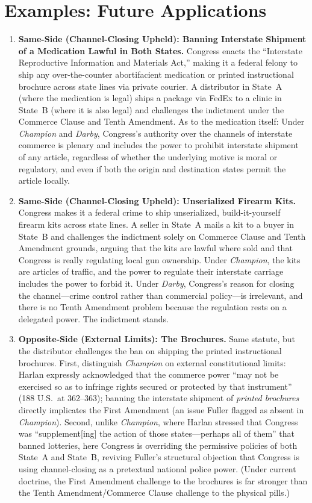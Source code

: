 \documentclass[12pt]{article}
\begin{document}
\section{Examples: Future Applications}
\begin{enumerate}

\item \textbf{Same-Side (Channel-Closing Upheld): Banning Interstate Shipment of a Medication Lawful in Both States.} Congress enacts the ``Interstate Reproductive Information and Materials Act,'' making it a federal felony to ship any over-the-counter abortifacient medication or printed instructional brochure across state lines via private courier. A distributor in State~A (where the medication is legal) ships a package via FedEx to a clinic in State~B (where it is also legal) and challenges the indictment under the Commerce Clause and Tenth Amendment. As to the medication itself: Under \textit{Champion} and \textit{Darby}, Congress's authority over the channels of interstate commerce is plenary and includes the power to prohibit interstate shipment of any article, regardless of whether the underlying motive is moral or regulatory, and even if both the origin and destination states permit the article locally.

\item \textbf{Same-Side (Channel-Closing Upheld): Unserialized Firearm Kits.} Congress makes it a federal crime to ship unserialized, build-it-yourself firearm kits across state lines. A seller in State~A mails a kit to a buyer in State~B and challenges the indictment solely on Commerce Clause and Tenth Amendment grounds, arguing that the kits are lawful where sold and that Congress is really regulating local gun ownership. Under \textit{Champion}, the kits are articles of traffic, and the power to regulate their interstate carriage includes the power to forbid it. Under \textit{Darby}, Congress's reason for closing the channel---crime control rather than commercial policy---is irrelevant, and there is no Tenth Amendment problem because the regulation rests on a delegated power. The indictment stands.

\item \textbf{Opposite-Side (External Limits): The Brochures.} Same statute, but the distributor challenges the ban on shipping the printed instructional brochures. First, distinguish \textit{Champion} on external constitutional limits: Harlan expressly acknowledged that the commerce power ``may not be exercised so as to infringe rights secured or protected by that instrument'' (188 U.S.\ at 362--363); banning the interstate shipment of \textit{printed brochures} directly implicates the First Amendment (an issue Fuller flagged as absent in \textit{Champion}). Second, unlike \textit{Champion}, where Harlan stressed that Congress was ``supplement[ing] the action of those states---perhaps all of them'' that banned lotteries, here Congress is overriding the permissive policies of both State~A and State~B, reviving Fuller's structural objection that Congress is using channel-closing as a pretextual national police power. (Under current doctrine, the First Amendment challenge to the brochures is far stronger than the Tenth Amendment/Commerce Clause challenge to the physical pills.)


\end{enumerate}
\end{document}
